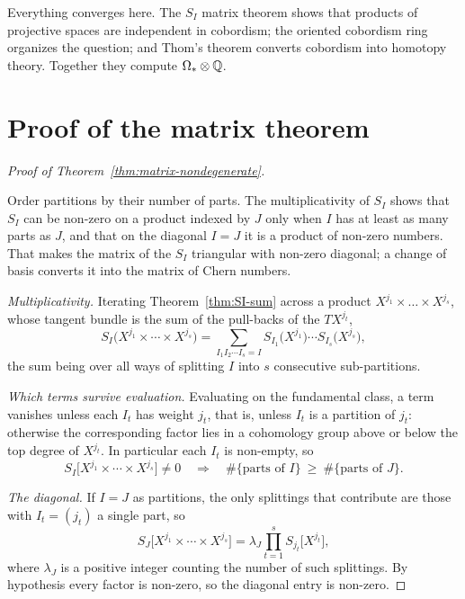 \lecture

\begin{guiding}
Everything converges here. The $S_I$ matrix theorem shows that products of
projective spaces are independent in cobordism; the oriented cobordism ring
organizes the question; and Thom's theorem converts cobordism into homotopy
theory. Together they compute $\Omega_*\otimes\mathbb{Q}$.
\end{guiding}

\section{Proof of the matrix theorem}

\begin{proof}[Proof of Theorem~\ref{thm:matrix-nondegenerate}]
\begin{strategy}
Order partitions by their number of parts. The multiplicativity of $S_I$ shows
that $S_I$ can be non-zero on a product indexed by $J$ only when $I$ has at
least as many parts as $J$, and that on the diagonal $I=J$ it is a product of
non-zero numbers. That makes the matrix of the $S_I$ triangular with non-zero
diagonal; a change of basis converts it into the matrix of Chern numbers.
\end{strategy}

 \emph{Multiplicativity.} Iterating Theorem~\ref{thm:SI-sum} across a
product $X^{j_1}\times\dots\times X^{j_s}$, whose tangent bundle is the sum of
the pull-backs of the $TX^{j_t}$,
\[
S_I\big(X^{j_1}\times\cdots\times X^{j_s}\big)
=\sum_{I_1I_2\cdots I_s=I}
S_{I_1}\big(X^{j_1}\big)\cdots S_{I_s}\big(X^{j_s}\big),
\]
the sum being over all ways of splitting $I$ into $s$ consecutive
sub-partitions.

 \emph{Which terms survive evaluation.} Evaluating on the fundamental
class, a term vanishes unless each $I_t$ has weight $j_t$, that is, unless
$I_t$ is a partition of $j_t$: otherwise the corresponding factor lies in a
cohomology group above or below the top degree of $X^{j_t}$. In particular each
$I_t$ is non-empty, so
\[
S_I\big[X^{j_1}\times\cdots\times X^{j_s}\big]\neq0
\quad\Longrightarrow\quad
\#\{\text{parts of }I\}\ \ge\ \#\{\text{parts of }J\}.
\]

 \emph{The diagonal.} If $I=J$ as partitions, the only splittings that
contribute are those with $I_t=(j_t)$ a single part, so
\[
S_J\big[X^{j_1}\times\cdots\times X^{j_s}\big]
=\lambda_J\prod_{t=1}^{s}S_{j_t}\big[X^{j_t}\big],
\]
where $\lambda_J$ is a positive integer counting the number of such splittings.
By hypothesis every factor is non-zero, so the diagonal entry is non-zero.


\end{proof}
